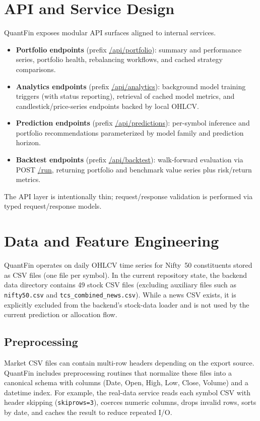 \documentclass[conference]{IEEEtran}
\begin{document}
\section{API and Service Design}\label{sec:api}
QuantFin exposes modular API surfaces aligned to internal services.
\begin{itemize}
\item \textbf{Portfolio endpoints} (prefix \url{/api/portfolio}): summary and performance series, portfolio health, rebalancing workflows, and cached strategy comparisons.
\item \textbf{Analytics endpoints} (prefix \url{/api/analytics}): background model training triggers (with status reporting), retrieval of cached model metrics, and candlestick/price-series endpoints backed by local OHLCV.
\item \textbf{Prediction endpoints} (prefix \url{/api/predictions}): per-symbol inference and portfolio recommendations parameterized by model family and prediction horizon.
\item \textbf{Backtest endpoints} (prefix \url{/api/backtest}): walk-forward evaluation via POST \url{/run}, returning portfolio and benchmark value series plus risk/return metrics.
\end{itemize}
The API layer is intentionally thin; request/response validation is performed via typed request/response models.

\section{Data and Feature Engineering}\label{sec:data}
QuantFin operates on daily OHLCV time series for Nifty~50 constituents stored as CSV files (one file per symbol). In the current repository state, the backend data directory contains 49 stock CSV files (excluding auxiliary files such as \texttt{nifty50.csv} and \texttt{tcs\_combined\_news.csv}). While a news CSV exists, it is explicitly excluded from the backend's stock-data loader and is not used by the current prediction or allocation flow.

\subsection{Preprocessing}
Market CSV files can contain multi-row headers depending on the export source. QuantFin includes preprocessing routines that normalize these files into a canonical schema with columns (Date, Open, High, Low, Close, Volume) and a datetime index. For example, the real-data service reads each symbol CSV with header skipping (\texttt{skiprows=3}), coerces numeric columns, drops invalid rows, sorts by date, and caches the result to reduce repeated I/O.
\end{document}
